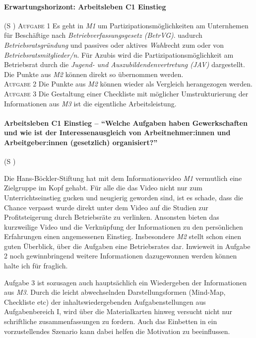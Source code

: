 \paragraph{Erwartungshorizont: Arbeitsleben C1 Einstieg} (\gls{S} \pageref{ARBEITSLEBEN-C1})
\textsc{Aufgabe 1} \quad Es geht in \emph{M1} um Partizipationsmöglichkeiten am Unternhemen für Beschäftige nach \emph{Betriebverfassungsgesetz (BetrVG)}.  \Gls{ua}durch \emph{Betriebsratsgründung} und passives oder aktives \emph{Wahl}recht zum oder von \emph{Betriebsratsmitglieder/n}. Für Azubis wird die Partizipationsmöglichkeit am Betriebsrat durch die \emph{Jugend- und Auszubildendenvertretung (JAV)} dargestellt. 
Die Punkte aus \emph{M2} können direkt so übernommen werden. \\ 

\textsc{Aufgabe 2} \quad Die Punkte aus \emph{M2} können wieder als Vergleich herangezogen werden. \\ 

\textsc{Aufgabe 3} \quad Die Gestaltung einer Checkliste mit möglicher Umstrukturierung der Informationen aus \emph{M3} ist die eigentliche Arbeitsleistung. 


\paragraph{Arbeitsleben C1 Einstieg -- \enquote{Welche Aufgaben haben Gewerkschaften und wie ist der Interessenausgleich von Arbeitnehmer:innen und Arbeitgeber:innen (gesetzlich) organisiert?}} (\gls{S} \pageref{ARBEITSLEBEN-C1})

Die Hans-Böckler-Stiftung hat mit dem Informationsvideo \emph{M1} vermutlich eine Zielgruppe im Kopf gehabt. Für alle die das Video nicht nur zum Unterrichtseinstieg gucken und neugierig geworden sind, ist es schade, dass die Chance verpasst wurde direkt unter dem Video auf die Studien zur Profitsteigerung durch Betriebsräte zu verlinken. 
Ansonsten bieten das kurzweilige Video und die Verknüpfung der Informationen zu den persönlichen Erfahrungen einen angemessenen Einstieg. 
Insbesondere \emph{M2} stellt schon einen guten Überblick, über die Aufgaben eine Betriebsrates dar. Inwieweit in Aufgabe 2 noch gewinnbringend weitere Informationen dazugewonnen werden können halte ich für fraglich. 

Aufgabe 3 ist sozusagen auch hauptsächlich ein Wiedergeben der Informationen aus \emph{M3}. Durch die leicht abwechselnden Darstellungsformen (Mind-Map, Checkliste \gls{etc}) der inhaltswiedergebenden Aufgabenstellungen aus Aufgabenbereich I, wird über die Materialkarten hinweg versucht nicht nur schriftliche zusammenfassungen zu fordern. Auch das Einbetten in ein vorzustellendes Szenario kann dabei helfen die Motivation zu beeinflussen. 


